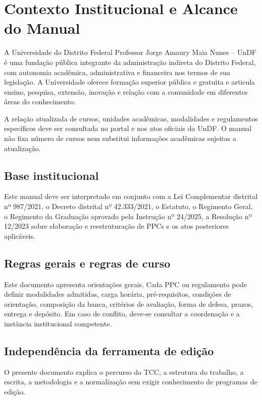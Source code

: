 \chapter{Contexto Institucional e Alcance do Manual}
\label{chap:contexto}

A Universidade do Distrito Federal Professor Jorge Amaury Maia Nunes -- UnDF é uma fundação pública integrante da administração indireta do Distrito Federal, com autonomia acadêmica, administrativa e financeira nos termos de sua legislação. A Universidade oferece formação superior pública e gratuita e articula ensino, pesquisa, extensão, inovação e relação com a comunidade em diferentes áreas do conhecimento.

A relação atualizada de cursos, unidades acadêmicas, modalidades e regulamentos específicos deve ser consultada no portal e nos atos oficiais da UnDF. O manual não fixa número de cursos nem substitui informações acadêmicas sujeitas a atualização.

\section{Base institucional}

Este manual deve ser interpretado em conjunto com a Lei Complementar distrital nº 987/2021, o Decreto distrital nº 42.333/2021, o Estatuto, o Regimento Geral, o Regimento da Graduação aprovado pela Instrução nº 24/2025, a Resolução nº 12/2023 sobre elaboração e reestruturação de PPCs e os atos posteriores aplicáveis.

\section{Regras gerais e regras de curso}

Este documento apresenta orientações gerais. Cada PPC ou regulamento pode definir modalidades admitidas, carga horária, pré-requisitos, condições de orientação, composição da banca, critérios de avaliação, forma de defesa, prazos, entrega e depósito. Em caso de conflito, deve-se consultar a coordenação e a instância institucional competente.

\regracurso

\section{Independência da ferramenta de edição}

O presente documento explica o percurso do TCC, a estrutura do trabalho, a escrita, a metodologia e a normalização sem exigir conhecimento de programas de edição.

